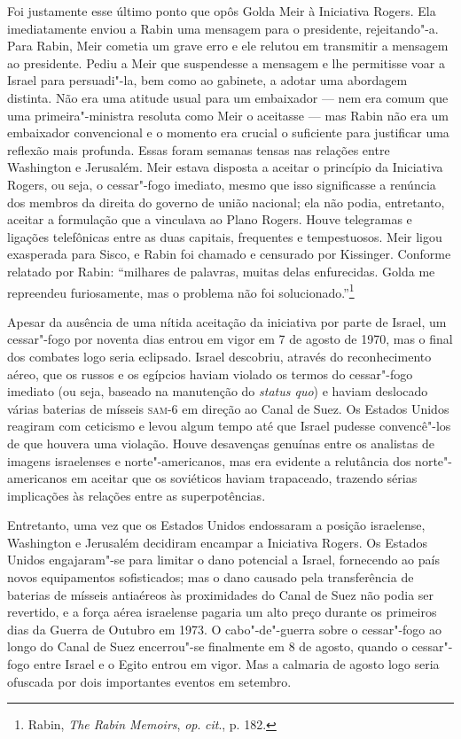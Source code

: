 Foi justamente esse último ponto que opôs Golda Meir à Iniciativa
Rogers. Ela imediatamente enviou a Rabin uma mensagem para o presidente,
rejeitando"-a. Para Rabin, Meir cometia um grave erro e ele relutou em
transmitir a mensagem ao presidente. Pediu a Meir que suspendesse a
mensagem e lhe permitisse voar a Israel para persuadi"-la, bem como ao gabinete,
a adotar uma abordagem distinta. Não era uma atitude usual para um
embaixador --- nem era comum que uma primeira"-ministra resoluta como Meir
o aceitasse --- mas Rabin não era um embaixador convencional e o momento
era crucial o suficiente para justificar uma reflexão mais profunda.
Essas foram semanas tensas nas relações entre Washington e Jerusalém.
Meir estava disposta a aceitar o princípio da Iniciativa Rogers, ou
seja, o cessar"-fogo imediato, mesmo que isso significasse a renúncia dos
membros da direita do governo de união nacional; ela não podia,
entretanto, aceitar a formulação que a vinculava ao Plano Rogers. Houve
telegramas e ligações telefônicas entre as duas capitais, frequentes e
tempestuosos. Meir ligou exasperada para Sisco, e Rabin foi chamado e
censurado por Kissinger. Conforme relatado por Rabin: ``milhares de
palavras, muitas delas enfurecidas. Golda me repreendeu furiosamente,
mas o problema não foi solucionado.''\footnote{Rabin, \textit{The Rabin Memoirs}, \textit{op}. \textit{cit}., p. 182.}

Apesar da ausência de uma nítida aceitação da iniciativa por parte de
Israel, um cessar"-fogo por noventa dias entrou em vigor em 7 de agosto
de 1970, mas o final dos combates logo seria eclipsado. Israel descobriu,
através do reconhecimento aéreo, que os russos e os egípcios haviam
violado os termos do cessar"-fogo imediato (ou seja, baseado na
manutenção do \textit{status quo}) e haviam deslocado várias baterias de
mísseis \textsc{sam}-6 em direção ao Canal de Suez. Os Estados Unidos reagiram
com ceticismo e levou algum tempo até que Israel pudesse convencê"-los de
que houvera uma violação. Houve desavenças genuínas entre os analistas
de imagens israelenses e norte"-americanos, mas era evidente a relutância
dos norte"-americanos em aceitar que os soviéticos haviam trapaceado,
trazendo sérias implicações às relações entre as superpotências.

Entretanto, uma vez que os Estados Unidos endossaram a posição
israelense, Washington e Jerusalém decidiram encampar a Iniciativa
Rogers. Os Estados Unidos engajaram"-se para limitar o dano potencial a
Israel, fornecendo ao país novos equipamentos sofisticados; mas o dano
causado pela transferência de baterias de mísseis antiaéreos às
proximidades do Canal de Suez não podia ser revertido, e a força aérea
israelense pagaria um alto preço durante os primeiros dias da Guerra de
Outubro em 1973. O cabo"-de"-guerra sobre o cessar"-fogo ao longo do Canal
de Suez encerrou"-se finalmente em 8 de agosto, quando o cessar"-fogo
entre Israel e o Egito entrou em vigor. Mas a calmaria de agosto logo
seria ofuscada por dois importantes eventos em setembro.

